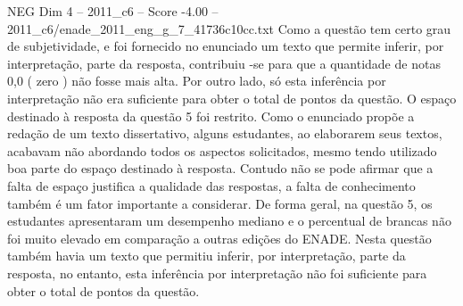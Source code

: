 \begin{textsample}{NEG Dim 4 – 2011\_c6 – Score -4.00 – 2011\_c6/enade\_2011\_eng\_g\_7\_41736c10cc.txt}
Como a questão tem certo grau de subjetividade, e foi fornecido no enunciado um texto que permite inferir, por interpretação, parte da resposta, contribuiu -se para que a quantidade de notas 0,0 ( zero ) não fosse mais alta.
Por outro lado, só esta inferência por interpretação não era suficiente para obter o total de pontos da questão.
O espaço destinado à resposta da questão 5 foi restrito.
Como o enunciado propõe a redação de um texto dissertativo, alguns estudantes, ao elaborarem seus textos, acabavam não abordando todos os aspectos solicitados, mesmo tendo utilizado boa parte do espaço destinado à resposta.
Contudo não se pode afirmar que a falta de espaço justifica a qualidade das respostas, a falta de conhecimento também é um fator importante a considerar.
De forma geral, na questão 5, os estudantes apresentaram um desempenho mediano e o percentual de brancas não foi muito elevado em comparação a outras edições do ENADE.
Nesta questão também havia um texto que permitiu inferir, por interpretação, parte da resposta, no entanto, esta inferência por interpretação não foi suficiente para obter o total de pontos da questão.

\end{textsample}
